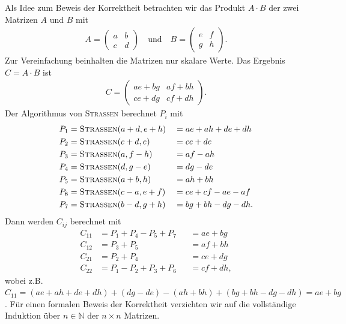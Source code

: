 \documentclass{scrartcl}
\begin{document}
Als Idee zum Beweis der Korrektheit betrachten wir das Produkt $A \cdot B$ der zwei Matrizen $A$ und $B$ mit
\begin{align*}
	A = \begin{pmatrix} a & b \\ c & d \end{pmatrix} \quad \text{und} \quad B = \begin{pmatrix} e & f \\ g & h \end{pmatrix}.
\end{align*}
Zur Vereinfachung beinhalten die Matrizen nur skalare Werte. Das Ergebnis $C = A \cdot B$ ist
\begin{align*}
	C = \begin{pmatrix} ae + bg & af + bh \\ ce + dg & cf + dh \end{pmatrix}.
\end{align*}
Der Algorithmus von \textsc{Strassen} berechnet $P_i$ mit
\begin{align*}
	P_1 &= \textsc{Strassen}(a + d, e + h) && = ae + ah + de + dh\\
	P_2 &= \textsc{Strassen}(c + d, e) && = ce + de \\
	P_3 &= \textsc{Strassen}(a, f - h) && = af - ah\\
	P_4 &= \textsc{Strassen}(d, g - e) && = dg - de \\
	P_5 &= \textsc{Strassen}(a + b, h) && = ah + bh \\
	P_6 &= \textsc{Strassen}(c - a, e + f) && = ce + cf - ae - af\\
	P_7 &= \textsc{Strassen}(b - d, g + h) && = bg + bh - dg - dh.
\end{align*}
Dann werden $C_{ij}$ berechnet mit
\begin{align*}
	C_{11} & = P_1 + P_4 - P_5 + P_7 && = ae + bg\\
	C_{12} & = P_3 + P_5 && = af + bh\\
	C_{21} & = P_2 + P_4 && = ce + dg\\
	C_{22} & = P_1 - P_2 + P_3 + P_6 && = cf + dh,
\end{align*}
wobei z.B. $ C_{11} = (ae + ah + de + dh) + (dg - de) - (ah + bh) + (bg + bh - dg - dh) = ae + bg$. Für einen formalen Beweis der Korrektheit verzichten wir auf die vollständige Induktion über $n \in \mathbb{N}$ der $n \times n$ Matrizen.
\end{document}
